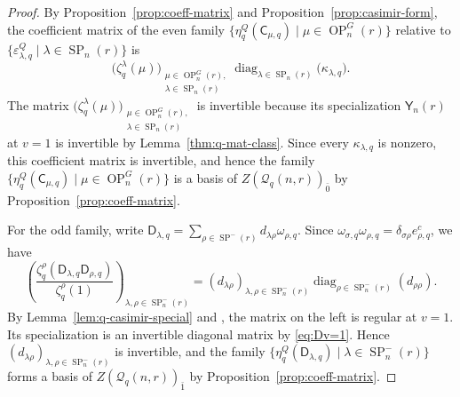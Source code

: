 \documentclass[11pt]{amsart}
\numberwithin{equation}{section}
\theoremstyle{plain}
\newtheorem{cor}[thm]{Corollary}
\theoremstyle{definition}
\theoremstyle{remark}
\begin{document}
\begin{proof}
By Proposition~\ref{prop:coeff-matrix} and Proposition~\ref{prop:casimir-form},
the coefficient matrix of the even family $\{\eta_q^Q(\mathsf C_{\mu,q})
\mid\mu\in\operatorname{OP}_n^G(r)\}$ relative to
$\{\varepsilon_{\lambda,q}^Q
\mid\lambda\in\operatorname{SP}_n(r)\}$ is
$$\bigl(\zeta_q^\lambda(\mu)\bigr)_{\substack{
\mu\in\operatorname{OP}_n^G(r),\\ \lambda\in\operatorname{SP}_n(r)}}\operatorname{diag}_{\lambda\in\operatorname{SP}_n(r)}
\bigl(\kappa_{\lambda,q}\bigr).$$
The matrix $\bigl(\zeta_q^\lambda(\mu)\bigr)_{\substack{
\mu\in\operatorname{OP}_n^G(r),\\ \lambda\in\operatorname{SP}_n(r)}}$ is invertible because its specialization $\mathsf Y_n(r)$ at $v=1$ is invertible by Lemma~\ref{thm:q-mat-class}. Since every $\kappa_{\lambda,q}$ is nonzero, this coefficient matrix is invertible,
and hence the family $\{\eta_q^Q(\mathsf C_{\mu,q})
\mid\mu\in\operatorname{OP}_n^G(r)\}$ is a basis of $Z(\mathcal Q_q(n,r))_{\bar0}$ by
Proposition~\ref{prop:coeff-matrix}.

For the odd family, write
$
\mathsf D_{\lambda,q}
=
\sum_{\rho\in\operatorname{SP}^-(r)}
d_{\lambda\rho}\omega_{\rho,q}.
$
Since $\omega_{\sigma,q}\omega_{\rho,q}
=\delta_{\sigma\rho}e_{\rho,q}^c$, we have
$$
\left(
\frac{\zeta_q^\rho(\mathsf D_{\lambda,q}\mathsf D_{\rho,q})}
     {\zeta_q^\rho(1)}
\right)_{\lambda,\rho\in\operatorname{SP}_n^-(r)}
=
(d_{\lambda\rho})_{\lambda,\rho\in\operatorname{SP}_n^-(r)}
\operatorname{diag}_{\rho\in\operatorname{SP}_n^-(r)}
(d_{\rho\rho}).
$$
By Lemma~\ref{lem:q-casimir-special} and
\cite[Proposition~2.5]{WW13}, the matrix on the left is
regular at $v=1$. Its specialization is an invertible
diagonal matrix by \eqref{eq:Dv=1}.
Hence $(d_{\lambda\rho})_{\lambda,\rho\in\operatorname{SP}_n^-(r)}$
is invertible, and the family
$\{\eta_q^Q(\mathsf D_{\lambda,q})
\mid\lambda\in\operatorname{SP}_n^-(r)\}$
forms a basis of $Z(\mathcal Q_q(n,r))_{\bar1}$ by
Proposition~\ref{prop:coeff-matrix}.
\end{proof}


\end{document}
